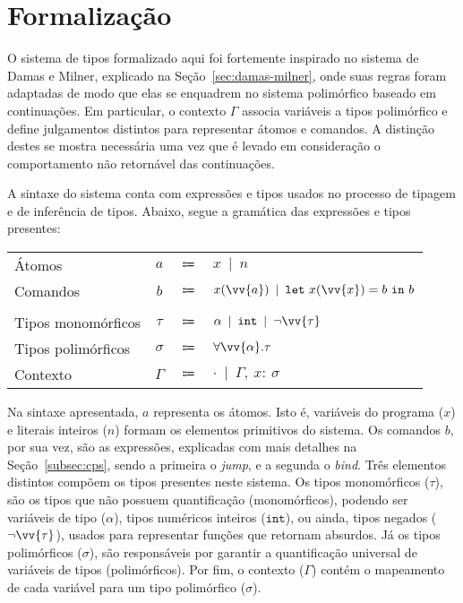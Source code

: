 \newcommand{\Mgu}{\ensuremath{\textit{mgu}}}
\newcommand{\MguList}{\ensuremath{\textit{mguList}}}
\newcommand{\UnifyVar}{\ensuremath{\textit{varBind}}}
\newcommand{\HeadSep}{\ensuremath{\textit{:}}}
\newcommand{\Length}{\ensuremath{\textit{length}}}
\newcommand{\List}{\ensuremath{\textit{list}}}

\section{Formalização}\label{sec:formalizacao}

O sistema de tipos formalizado aqui foi fortemente inspirado no sistema de Damas e Milner, explicado na Seção~\ref{sec:damas-milner}, onde suas regras foram adaptadas de modo que elas se enquadrem no sistema polimórfico baseado em continuações.
Em particular, o contexto $\Gamma$ associa variáveis a tipos polimórfico e define julgamentos distintos para representar átomos e comandos.
A distinção destes se mostra necessária uma vez que é levado em consideração o comportamento não retornável das continuações. 

A sintaxe do sistema conta com expressões e tipos usados no processo de tipagem e de inferência de tipos.
Abaixo, segue a gramática das expressões e tipos presentes:

\phantom{Newline}

\begin{tabular}{lccl}
  Átomos & $a$ & $\Coloneqq$ & $x \enspace|\enspace n$ \\
  Comandos & $b$ & $\Coloneqq$ & $x(\vv{a}) \enspace|\enspace \mathtt{let}\ x(\vv{x}) = b\ \mathtt{in}\ b$ \\
  \\
  Tipos monomórficos & $\tau$ & $\Coloneqq$ & $\alpha \enspace|\enspace \mathtt{int} \enspace|\enspace \neg\vv{\tau}$ \\
  Tipos polimórficos & $\sigma$ & $\Coloneqq$ & $\forall\vv{\alpha}.\tau$ \\
  Contexto & $\Gamma$ & $\Coloneqq$ & $\cdot \enspace|\enspace \Gamma,\ x{:}\ \sigma$ \\
\end{tabular}\label{cps-type-system}

\phantom{Newline}

\noindent Na sintaxe apresentada, $a$ representa os átomos. Isto é, variáveis do programa ($x$) e literais inteiros ($n$) formam os elementos primitivos do sistema.
Os comandos $b$, por sua vez, são as expressões, explicadas com mais detalhes na Seção~\ref{subsec:cps}, sendo a primeira o \textit{jump}, e a segunda o \textit{bind}.
Três elementos distintos compõem os tipos presentes neste sistema.
Os tipos monomórficos ($\tau$), são os tipos que não possuem quantificação (monomórficos), podendo ser variáveis de tipo ($\alpha$), tipos numéricos inteiros ($\mathtt{int}$), ou ainda, tipos negados ($\neg\vv{\tau}$), usados para representar funções que retornam absurdos.
Já os tipos polimórficos ($\sigma$), são responsáveis por garantir a quantificação universal de variáveis de tipos (polimórficos).
Por fim, o contexto ($\Gamma$) contém o mapeamento de cada variável para um tipo polimórfico ($\sigma$).

